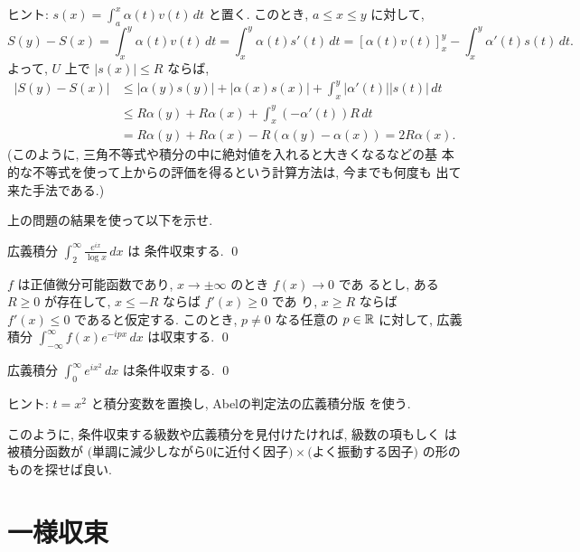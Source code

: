 \documentclass[12pt,twoside]{jarticle}
\begin{document}
\noindent ヒント: $s(x) = \int_a^x \alpha(t)v(t)\,dt$ と置く. このとき,
$a \le x \le y$ に対して,
\[
  S(y) - S(x)
  = \int_x^y \alpha(t) v(t) \,dt
  = \int_x^y \alpha(t) s'(t) \,dt
  = \left[ \alpha(t) v(t) \right]_x^y - \int_x^y \alpha'(t) s(t) \,dt.
\]
よって, $U$ 上で $|s(x)| \le R$ ならば, 
\begin{align*}
  |S(y) - S(x)|
  &
  \le |\alpha(y)s(y)| + |\alpha(x)s(x)|
  + \int_x^y |\alpha'(t)| |s(t)| \,dt
  \\
  &
  \le R \alpha(y) + R \alpha(x) + \int_x^y (- \alpha'(t)) R \,dt
  \\
  &
  = R \alpha(y) + R \alpha(x) - R (\alpha(y) - \alpha(x))
  = 2 R \alpha(x).
\end{align*}
(このように, 三角不等式や積分の中に絶対値を入れると大きくなるなどの基
本的な不等式を使って上からの評価を得るという計算方法は, 今までも何度も
出て来た手法である.)

上の問題の結果を使って以下を示せ. 

\begin{question}
  広義積分 $\displaystyle \int_2^\infty \frac{e^{ix}}{\log x} \,dx$ は
  条件収束する. 
  \qed
\end{question}

\begin{question}
  $f$ は正値微分可能函数であり, $x\to\pm\infty$ のとき $f(x)\to0$ であ
  るとし, ある $R\ge 0$ が存在して, $x\le -R$ ならば $f'(x)\ge 0$ であ
  り, $x\ge R$ ならば $f'(x) \le 0$ であると仮定する. %
  このとき, $p\ne 0$ なる任意の $p\in{\mathbb R}$ に対して, %
  広義積分 $\int_{-\infty}^\infty f(x) e^{-ipx}\,dx$ は収束する.
  \qed
\end{question}

\begin{question}
  広義積分 $\int_0^\infty e^{ix^2}\,dx$ は条件収束する. \qed
\end{question}

\noindent ヒント: $t=x^2$ と積分変数を置換し, Abelの判定法の広義積分版
を使う.

このように, 条件収束する級数や広義積分を見付けたければ, 級数の項もしく
は被積分函数が %
\(
  \text{(単調に減少しながら$0$に近付く因子)}
  \times
  \text{(よく振動する因子)}
\) %
の形のものを探せば良い.


\section{一様収束}
\end{document}
